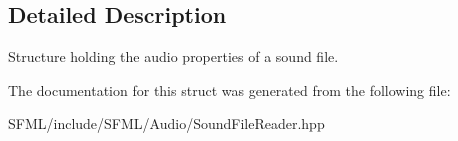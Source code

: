 \subsection{Detailed Description}
Structure holding the audio properties of a sound file. 

\begin{DoxyVerb}\end{DoxyVerb}
 

The documentation for this struct was generated from the following file\+:\begin{DoxyCompactItemize}
\item 
S\+F\+M\+L/include/\+S\+F\+M\+L/\+Audio/Sound\+File\+Reader.\+hpp\end{DoxyCompactItemize}
